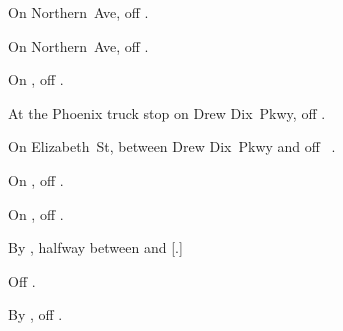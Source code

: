 
\begin{LocationList}

On Northern~Ave, off  .

On Northern~Ave, off  .

On , off  .

At the Phoenix truck stop on Drew Dix~Pkwy, off  .

On Elizabeth~St, between Drew Dix~Pkwy and  off~ .

On , off  .

On , off  .

By , halfway between  and [.]

Off  .

By , off  .

\end{LocationList}

